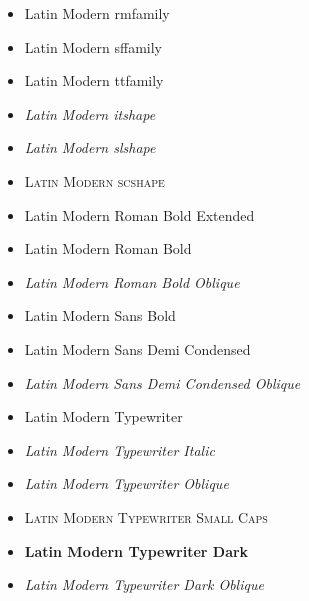 \begin{itemize}
\item \rmfamily  Latin Modern rmfamily
\item \sffamily  Latin Modern sffamily
\item \ttfamily  Latin Modern ttfamily
\end{itemize}

\begin{itemize}
\item {\itshape  Latin Modern itshape}
\item {\slshape  Latin Modern slshape}
\item {\scshape Latin Modern scshape}
\end{itemize}

\begin{itemize}
\bfseries
\item Latin Modern Roman Bold Extended
\item {}\selectfont Latin Modern Roman Bold
\item {}\slshape Latin Modern Roman Bold Oblique
\end{itemize}
\begin{itemize}
\sffamily
\bfseries
\item Latin Modern Sans Bold
\item {}\selectfont Latin Modern Sans Demi Condensed
\item {}\slshape Latin Modern Sans Demi Condensed Oblique
\end{itemize}

\begin{itemize}
\item \ttfamily Latin Modern Typewriter
\item \itshape Latin Modern Typewriter Italic
\item \slshape Latin Modern Typewriter Oblique
\item \scshape Latin Modern Typewriter Small Caps
\item \bfseries Latin Modern Typewriter Dark
\item \slshape Latin Modern Typewriter Dark Oblique
\end{itemize}



